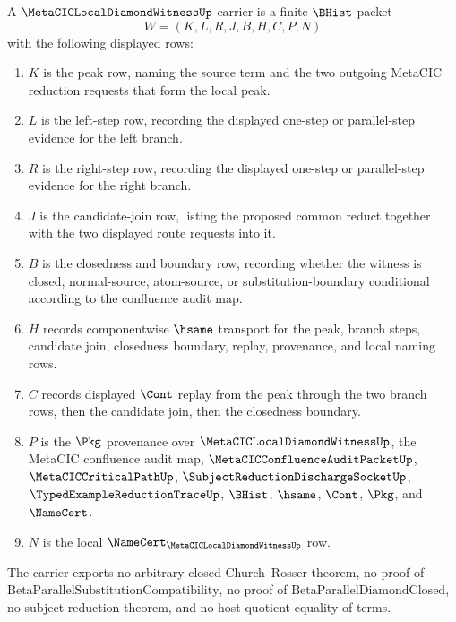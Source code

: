 \begin{definition}
\label{def:metacic-local-diamond-witness-carrier}
A $\MetaCICLocalDiamondWitnessUp$ carrier is a finite $\BHist$ packet
$$
W=(K,L,R,J,B,H,C,P,N)
$$
with the following displayed rows:
\begin{enumerate}
\item $K$ is the peak row, naming the source term and the two outgoing MetaCIC reduction requests that form the local peak.
\item $L$ is the left-step row, recording the displayed one-step or parallel-step evidence for the left branch.
\item $R$ is the right-step row, recording the displayed one-step or parallel-step evidence for the right branch.
\item $J$ is the candidate-join row, listing the proposed common reduct together with the two displayed route requests into it.
\item $B$ is the closedness and boundary row, recording whether the witness is closed, normal-source, atom-source, or substitution-boundary conditional according to the confluence audit map.
\item $H$ records componentwise $\hsame$ transport for the peak, branch steps, candidate join, closedness boundary, replay, provenance, and local naming rows.
\item $C$ records displayed $\Cont$ replay from the peak through the two branch rows, then the candidate join, then the closedness boundary.
\item $P$ is the $\Pkg$ provenance over $\MetaCICLocalDiamondWitnessUp$, the MetaCIC confluence audit map, $\MetaCICConfluenceAuditPacketUp$, $\MetaCICCriticalPathUp$, $\SubjectReductionDischargeSocketUp$, $\TypedExampleReductionTraceUp$, $\BHist$, $\hsame$, $\Cont$, $\Pkg$, and $\NameCert$.
\item $N$ is the local $\NameCert_{\MetaCICLocalDiamondWitnessUp}$ row.
\end{enumerate}
The carrier exports no arbitrary closed Church--Rosser theorem, no proof of $\mathrm{BetaParallelSubstitutionCompatibility}$, no proof of $\mathrm{BetaParallelDiamondClosed}$, no subject-reduction theorem, and no host quotient equality of terms.
\end{definition}

